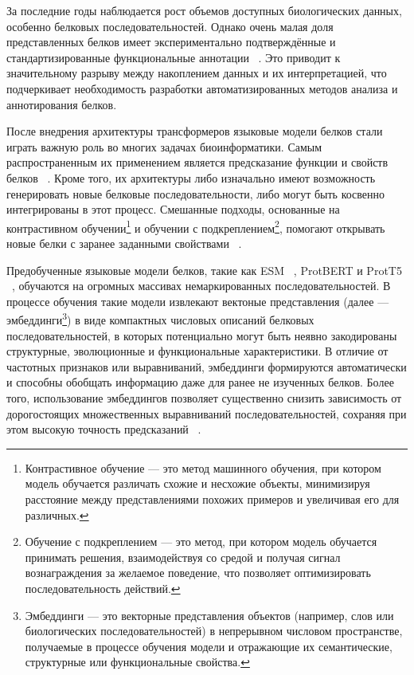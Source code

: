 \documentclass[specification,annotation,times]{itmo-student-thesis}
\begin{document}
За последние годы наблюдается рост объемов доступных биологических данных, особенно белковых последовательностей. Однако очень малая доля представленных белков имеет экспериментально подтверждённые и стандартизированные функциональные аннотации ~\cite{uniprot2023uniprot}. Это приводит к значительному разрыву между накоплением данных и их интерпретацией, что подчеркивает необходимость разработки автоматизированных методов анализа и аннотирования белков. 

После внедрения архитектуры трансформеров языковые модели белков стали играть важную роль во многих задачах биоинформатики. Самым распространенным их применением является предсказание функции и свойств белков ~\cite{kulmanov2020deepgoplus}. Кроме того, их архитектуры либо изначально имеют возможность генерировать новые белковые последовательности, либо могут быть косвенно интегрированы в этот процесс. Смешанные подходы, основанные на контрастивном обучении\footnote{Контрастивное обучение — это метод машинного обучения, при котором модель обучается различать схожие и несхожие объекты, минимизируя расстояние между представлениями похожих примеров и увеличивая его для различных.} и обучении с подкреплением\footnote{Обучение с подкреплением — это метод, при котором модель обучается принимать решения, взаимодействуя со средой и получая сигнал вознаграждения за желаемое поведение, что позволяет оптимизировать последовательность действий.}, помогают открывать новые белки с заранее заданными свойствами ~\cite{madani2023large}.

Предобученные языковые модели белков, такие как ESM ~\cite{rives2021biological}, ProtBERT и ProtT5 ~\cite{elnaggar2021prottrans}, обучаются на огромных массивах немаркированных последовательностей. В процессе обучения такие модели извлекают вектоные представления (далее --- эмбеддинги\footnote{Эмбеддинги — это векторные представления объектов (например, слов или биологических последовательностей) в непрерывном числовом пространстве, получаемые в процессе обучения модели и отражающие их семантические, структурные или функциональные свойства.}) в виде компактных числовых описаний белковых последовательностей, в которых потенциально могут быть неявно закодированы структурные, эволюционные и функциональные характеристики. В отличие от частотных признаков или выравниваний, эмбеддинги формируются автоматически и способны обобщать информацию даже для ранее не изученных белков. Более того, использование эмбеддингов позволяет существенно снизить зависимость от дорогостоящих множественных выравниваний последовательностей, сохраняя при этом высокую точность предсказаний ~\cite{elnaggar2021prottrans}.
\end{document}
